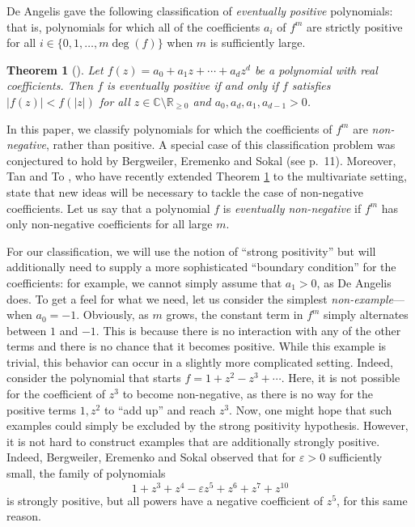 \documentclass{daj}
\def\eps{\varepsilon}
\def\C{\mathbb{C}}
\newcommand{\R}{\mathbb{R}}
\newtheorem{theorem}{Theorem}
\theoremstyle{definition}
\theoremstyle{remark}
\begin{document}
De Angelis gave the following classification of \emph{eventually positive} polynomials: that is, polynomials for which 
all of the coefficients $a_i$ of $f^m$ are strictly positive for all $i \in \{0,1, \ldots, m\deg(f)\}$ when $m$ is sufficiently large.

\begin{theorem}[\cite{deAngelis-positivity}] \label{th:deAngelis}
	Let $f(z) = a_0 + a_1 z + \cdots + a_{d} z^d$ be a polynomial with real coefficients.
	Then $f$ is eventually positive if and only if $f$ satisfies $|f(z)| < f(|z|)$ for all $z \in \C \setminus \R_{\geq 0}$ and $a_0, a_d, a_1,a_{d-1} > 0$. 
\end{theorem}

In this paper, we classify polynomials for which the coefficients of $f^m$ are \emph{non-negative}, rather than positive. A special case of this classification problem was conjectured to hold by Bergweiler, Eremenko and Sokal \cite{bes}
(see p.\ 11). Moreover, Tan and To \cite{tan-to-2017,tan-to-2019}, who have recently extended Theorem \ref{th:deAngelis} to the multivariate setting, state that
new ideas will be necessary to tackle the case of non-negative coefficients. Let us say that a polynomial $f$ is \emph{eventually non-negative}
if $f^m$ has only non-negative coefficients for all large $m$.

For our classification, we will use the notion of ``strong positivity'' but will additionally need to supply a more sophisticated ``boundary condition'' for the coefficients: for example, we cannot simply assume that $a_1 > 0$, as De Angelis does. To get a feel for what we need, let us consider the simplest \emph{non-example}---when $a_0 = -1$. Obviously, as $m$ grows, the constant term in $f^m$ simply alternates between $1$ and $-1$. This is because there is no interaction with 
any of the other terms and there is no chance that it becomes positive. While this example is trivial, this behavior can occur in a slightly more complicated setting. Indeed, consider the polynomial that starts $f = 1 + z^2  - z^3 + \cdots $. Here, it is not possible 
for the coefficient of $z^3$ to become non-negative, as there is no way for the positive terms $1,z^2$ to ``add up'' and reach $z^3$.
Now, one might hope that such examples could simply be excluded by the strong positivity hypothesis. However, it is not hard to construct examples
that are additionally strongly positive. Indeed, Bergweiler, Eremenko and Sokal observed that for $\eps > 0$ sufficiently small, the family of polynomials $$1 + z^3 + z^4 - \eps z^5 + z^6 + z^7 + z^{10}$$ is strongly positive, but all powers have a negative coefficient of $z^5$,  for this same reason. 
\end{document}
